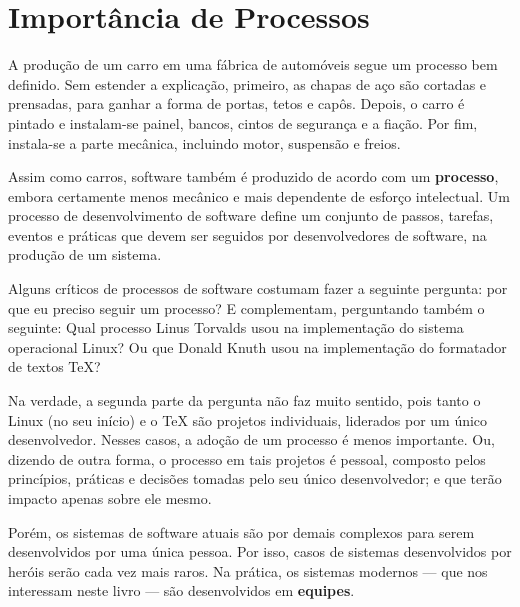 \documentclass[
  11pt,
  twoside]{book}
\begin{document}
\hypertarget{importuxe2ncia-de-processos}{%
\section{Importância de Processos}\label{importuxe2ncia-de-processos}}

A produção de um carro em uma fábrica de automóveis segue um processo
bem definido. Sem estender a explicação, primeiro, as chapas de aço são
cortadas e prensadas, para ganhar a forma de portas, tetos e capôs.
Depois, o carro é pintado e instalam-se painel, bancos, cintos de
segurança e a fiação. Por fim, instala-se a parte mecânica, incluindo
motor, suspensão e freios.

Assim como carros, software também é produzido de acordo com um
\textbf{processo}, embora certamente menos mecânico e mais dependente de
esforço intelectual. Um processo de desenvolvimento de software define
um conjunto de passos, tarefas, eventos e práticas que devem ser
seguidos por desenvolvedores de software, na produção de um sistema.

   
Alguns críticos de processos de software costumam fazer a seguinte
pergunta: por que eu preciso seguir um processo? E complementam,
perguntando também o seguinte: Qual processo Linus Torvalds usou na
implementação do sistema operacional Linux? Ou que Donald Knuth usou na
implementação do formatador de textos TeX?

Na verdade, a segunda parte da pergunta não faz muito sentido, pois
tanto o Linux (no seu início) e o TeX são projetos individuais,
liderados por um único desenvolvedor. Nesses casos, a adoção de um
processo é menos importante. Ou, dizendo de outra forma, o processo em
tais projetos é pessoal, composto pelos princípios, práticas e decisões
tomadas pelo seu único desenvolvedor; e que terão impacto apenas sobre
ele mesmo.

Porém, os sistemas de software atuais são por demais complexos para
serem desenvolvidos por uma única pessoa. Por isso, casos de sistemas
desenvolvidos por heróis serão cada vez mais raros. Na prática, os
sistemas modernos --- que nos interessam neste livro --- são
desenvolvidos em \textbf{equipes}.
\end{document}
